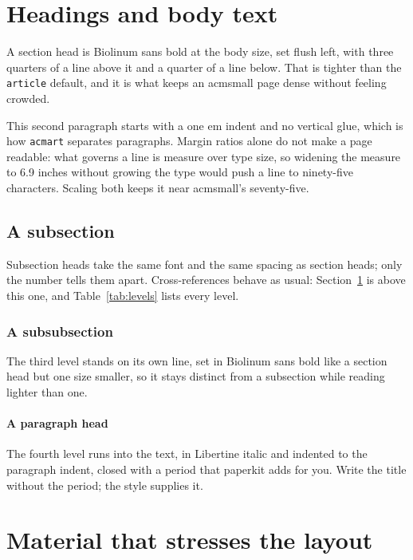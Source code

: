 \documentclass{article}
\begin{document}
\makepaperheader

\section{Headings and body text}
\label{sec:headings}

A section head is Biolinum sans bold at the body size, set flush left, with
three quarters of a line above it and a quarter of a line below. That is
tighter than the \texttt{article} default, and it is what keeps an acmsmall
page dense without feeling crowded.

This second paragraph starts with a one em indent and no vertical glue, which
is how \texttt{acmart} separates paragraphs. Margin ratios alone do not make a
page readable: what governs a line is measure over type size, so widening the
measure to 6.9 inches without growing the type would push a line to ninety-five
characters. Scaling both keeps it near acmsmall's seventy-five.

\subsection{A subsection}
\label{sec:sub}

Subsection heads take the same font and the same spacing as section heads; only
the number tells them apart. Cross-references behave as usual:
Section~\ref{sec:headings} is above this one, and Table~\ref{tab:levels} lists
every level.

\subsubsection{A subsubsection}
The third level stands on its own line, set in Biolinum sans bold like a
section head but one size smaller, so it stays distinct from a subsection
while reading lighter than one.

\paragraph{A paragraph head} The fourth level runs into the text, in
Libertine italic and indented to the paragraph indent, closed with a period
that paperkit adds for you. Write the title without the period; the style
supplies it.

\section{Material that stresses the layout}
\end{document}
